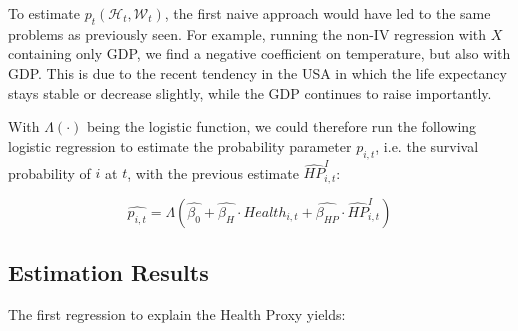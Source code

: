 \documentclass{article}
\begin{document}

To estimate $p_{t}(\mathcal{H}_{t},\mathcal{W}_{t})$,
the first naive approach would have led to the same 
problems as previously seen.
For example, running the non-IV regression with $X$ containing only GDP, 
we find a negative coefficient on temperature, but also with GDP. 
This is due to the recent tendency in the USA in which the life expectancy stays 
stable or decrease slightly, while the GDP continues to raise importantly.

With $\Lambda(\cdot)$ being the logistic
function, we could therefore run the following logistic regression 
to estimate the probability parameter $p_{i,t}$, i.e. the
survival probability of $i$ at $t$,
with the previous estimate $\widehat{HP}_{i,t}^{I}$: 


\begin{equation}
    \widehat{p_{i,t}} = \Lambda \left( \widehat{\beta_0} +
    \widehat{\beta_{H}} \cdot Health_{i,t} +
    \widehat{\beta_{HP}} \cdot \widehat{HP}_{i,t}^{I}\right)
\end{equation}

\subsection{Estimation Results}

The first regression to explain the Health Proxy yields: 
\end{document}
